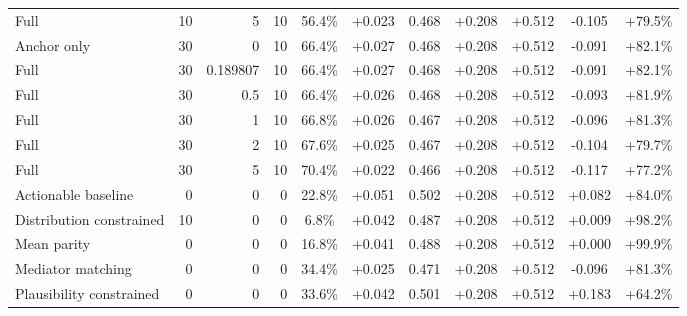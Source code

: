 \begin{table}[htbp]
\begin{tabular}{lrrrccccccc}
Full & 10 & 5 & 10 & 56.4\% & +0.023 & 0.468 & +0.208 & +0.512 & -0.105 & +79.5\% \\
Anchor only & 30 & 0 & 10 & 66.4\% & +0.027 & 0.468 & +0.208 & +0.512 & -0.091 & +82.1\% \\
Full & 30 & 0.189807 & 10 & 66.4\% & +0.027 & 0.468 & +0.208 & +0.512 & -0.091 & +82.1\% \\
Full & 30 & 0.5 & 10 & 66.4\% & +0.026 & 0.468 & +0.208 & +0.512 & -0.093 & +81.9\% \\
Full & 30 & 1 & 10 & 66.8\% & +0.026 & 0.467 & +0.208 & +0.512 & -0.096 & +81.3\% \\
Full & 30 & 2 & 10 & 67.6\% & +0.025 & 0.467 & +0.208 & +0.512 & -0.104 & +79.7\% \\
Full & 30 & 5 & 10 & 70.4\% & +0.022 & 0.466 & +0.208 & +0.512 & -0.117 & +77.2\% \\
Actionable baseline & 0 & 0 & 0 & 22.8\% & +0.051 & 0.502 & +0.208 & +0.512 & +0.082 & +84.0\% \\
Distribution constrained & 10 & 0 & 0 & 6.8\% & +0.042 & 0.487 & +0.208 & +0.512 & +0.009 & +98.2\% \\
Mean parity & 0 & 0 & 0 & 16.8\% & +0.041 & 0.488 & +0.208 & +0.512 & +0.000 & +99.9\% \\
Mediator matching & 0 & 0 & 0 & 34.4\% & +0.025 & 0.471 & +0.208 & +0.512 & -0.096 & +81.3\% \\
Plausibility constrained & 0 & 0 & 0 & 33.6\% & +0.042 & 0.501 & +0.208 & +0.512 & +0.183 & +64.2\% \\
\bottomrule
\end{tabular}
\end{table}